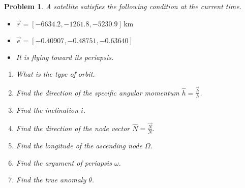 \documentclass[10pt]{article}
\newcommand{\parenth}[1]{\ensuremath{\left( #1 \right)}}
\newcommand{\refeqn}[1]{(\ref{eqn:#1})}
\theoremstyle{plain}\theorembodyfont{\normalfont}
\newtheorem{prob}{Problem}[section]
\newenvironment{subprob}%
{\renewcommand{\theenumi}{\alph{enumi}}\renewcommand{\labelenumi}{(\theenumi)}\begin{enumerate}}%
{\end{enumerate}}%
\begin{document}


\begin{prob} A satellite satisfies the following condition at the current time.
\begin{itemize}
\item $\vec r = [-6634.2, -1261.8, -5230.9]\,\mathrm{km}$
\item $\vec e = [-0.40907, -0.48751, -0.63640]$
\item It is flying toward its periapsis.
\end{itemize}
\begin{subprob}
\item What is the type of orbit.
\item Find the direction of the specific angular momentum $\hat h = \frac{\vec h}{h}$.
\item Find the inclination $i$. %
\item Find the direction of the node vector $\hat N = \frac{\vec N}{N}$.
\item Find the longitude of the ascending node $\Omega$.
\item Find the argument of periapsis $\omega$.
\item Find the true anomaly $\theta$.
\end{subprob}
\end{prob}
\end{document}
